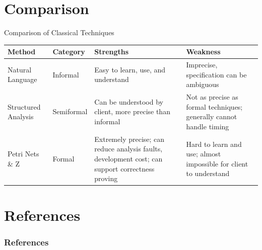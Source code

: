 \documentclass{beamer}
\begin{document}
	\section{Comparison}
	\begin{frame}{Comparison of Classical Techniques}
	\begin{footnotesize}
        \begin{table}[]
        \centering
        \begin{tabular}{| p{1.5cm} | p{1.5cm} | p{2.5cm} | p{2.5cm} |}
        \hline
        \textbf{Method} & \textbf{Category} & \textbf{Strengths}                                                                                                                         & \textbf{Weakness}                                                                                            \\ \hline
Natural Language                   & Informal          & Easy to learn, use, and understand                                                               & Imprecise, specification can be ambiguous                           \\ \hline
Structured Analysis                & Semiformal        & Can be understood by client, more precise than informal                                          & Not as precise as formal techniques; generally cannot handle timing \\ \hline
Petri Nets \& Z                    & Formal            & Extremely precise; can reduce analysis faults, development cost; can support correctness proving & Hard to learn and use; almost impossible for client to understand   \\ \hline
        \end{tabular}
        \end{table}
        \end{footnotesize}
\end{frame}
	
	\section{References}
	\begin{frame}[allowframebreaks]
        \frametitle{References}
        
        
	\end{frame}
\end{document}
